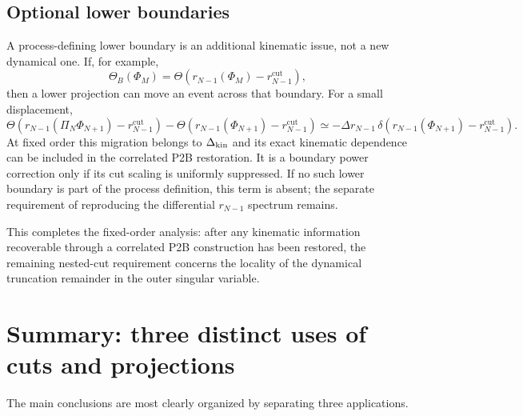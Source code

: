 \documentclass[11pt]{article}
\newcommand{\rnm}{r_{N-1}}
\newcommand{\cut}{\mathrm{cut}}
\newcommand{\Ph}{\Phi}
\begin{document}
\subsection{Optional lower boundaries}
\label{sec:born-boundaries}

A process-defining lower boundary is an additional kinematic issue, not a new dynamical one. If, for
example,
\begin{equation}
\Theta_B(\Ph_M)=
\Theta\!\left(\rnm(\Ph_M)-\rnm^{\cut}\right),
\label{eq:active-born-boundary}
\end{equation}
then a lower projection can move an event across that boundary. For a small displacement,
\begin{equation}
\Theta\!\left(\rnm(\Pi_N\Ph_{N+1})-\rnm^{\cut}\right)
-
\Theta\!\left(\rnm(\Ph_{N+1})-\rnm^{\cut}\right)
\simeq
-\Delta\rnm\,
\delta\!\left(\rnm(\Ph_{N+1})-\rnm^{\cut}\right).
\label{eq:boundary-expansion}
\end{equation}
At fixed order this migration belongs to $\Delta_{\rm kin}$ and its exact kinematic dependence can be included
in the correlated P2B restoration. It is a boundary power correction only if its cut scaling is uniformly
suppressed. If no such lower boundary is part of the process definition, this term is absent; the separate
requirement of reproducing the differential $\rnm$ spectrum remains.

This completes the fixed-order analysis: after any kinematic information recoverable through a correlated
P2B construction has been restored, the remaining nested-cut requirement concerns the locality of the
dynamical truncation remainder in the outer singular variable.

\section{Summary: three distinct uses of cuts and projections}

The main conclusions are most clearly organized by separating three applications.
\end{document}
